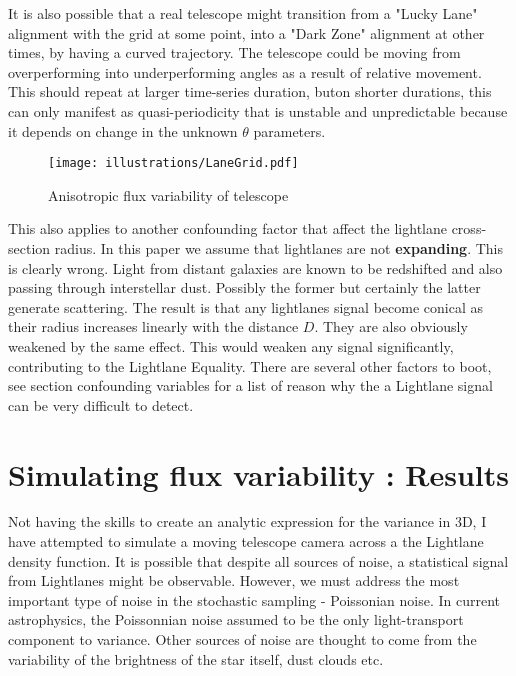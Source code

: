 \documentclass[notitlepage]{article}
\begin{document}
It is also possible that a real telescope might transition from a "Lucky Lane" alignment with the grid at some point, into a "Dark Zone" alignment at other times, by having a curved trajectory. The telescope could be moving from overperforming into underperforming angles as a result of relative movement. This should repeat at larger time-series duration, buton shorter durations, this can only manifest as quasi-periodicity that is unstable and unpredictable because it depends on change in the unknown $\theta$  parameters. 

\begin{figure}
\centering
{\texttt{[image: illustrations/LaneGrid.pdf]}}
\caption{Anisotropic flux variability of telescope}
\label{fig:densityIsotropy}
\end{figure}

This also applies to another confounding factor that affect the lightlane cross-section radius. In this paper we assume that lightlanes are not \textbf{expanding}. This is clearly wrong. Light from distant galaxies are known to be redshifted and also passing through interstellar dust. Possibly the former but certainly the latter generate scattering. The result is that any lightlanes signal become conical as their radius increases linearly with the distance $D$. They are also obviously weakened by the same effect. This would weaken any signal significantly, contributing to the Lightlane Equality. There are several other factors to boot, see section confounding variables for a list of reason why the a Lightlane signal can be very difficult to detect.

\section{ Simulating flux variability : Results}
Not having the skills to create an analytic expression for the variance in 3D, I have  attempted to simulate a moving telescope camera across a the Lightlane density function. It is possible that despite all sources of noise, a statistical signal from Lightlanes might be observable. However, we must address the most important type of noise in the stochastic sampling - Poissonian noise. In current astrophysics, the Poissonnian noise assumed to be the only light-transport component to variance. Other sources of noise are thought to come from the variability of the brightness of the star itself, dust clouds etc.
\end{document}
